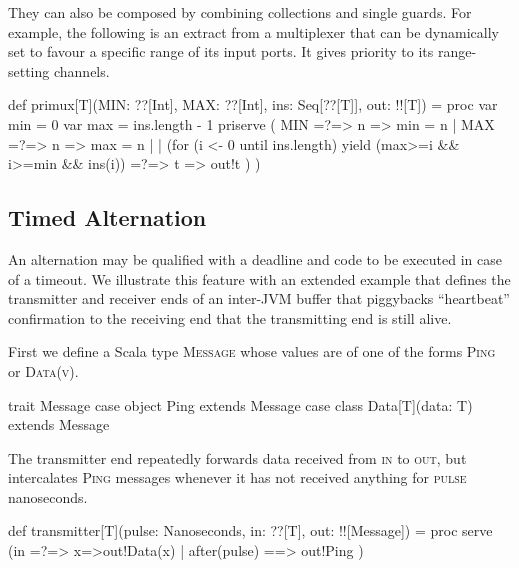 \documentclass[12pt]{IOS-Book-Article-CPA-2017}
\begin{document}
They can also be composed by combining collections and single guards. For example,
the following is an extract from a multiplexer that can be
dynamically set to favour a specific range of its input ports.
It gives priority to its range-setting channels.
\begin{code*}[minmax.scala]
import ox.CSO._
object minmax
{ 
\end{code*}
\begin{code}
  def primux[T](MIN: ??[Int], MAX: ??[Int], ins: Seq[??[T]], out: !![T]) = 
  proc
  { var min = 0
    var max = ins.length - 1
    priserve ( MIN =?=> { n => min = n }
             | MAX =?=> { n => max = n }
             | | (for (i <- 0 until ins.length) yield 
                    (max>=i && i>=min && ins(i)) =?=> { t => out!t } )
             ) 
  }
\end{code}
\begin{code*}[]
}
\end{code*}



\subsection{Timed Alternation}
\label{Timed Alternation}
An alternation may be qualified with a deadline and code to be
executed in case of a timeout. We illustrate this feature
with an extended example that defines the transmitter and receiver
ends of an inter-JVM buffer that piggybacks ``heartbeat'' confirmation
to the receiving end that the transmitting end is still alive.

First we define a Scala type \textsc{Message} whose values are of one
of the forms \textsc{Ping} or \textsc{Data(v)}. 
\begin{code}
trait Message
case  object  Ping             extends Message {}
case  class   Data[T](data: T) extends Message {}
\end{code}

The transmitter end repeatedly forwards data received from \textsc{in}
to \textsc{out}, but intercalates \textsc{Ping} messages whenever
it has not received anything for \textsc{pulse} nanoseconds.
\begin{code}
def transmitter[T](pulse: Nanoseconds, in: ??[T], out: !![Message]) = 
  proc 
  { serve (in =?=> {x=>out!Data(x)} | after(pulse) ==> { out!Ping }) } 
\end{code}
\end{document}

